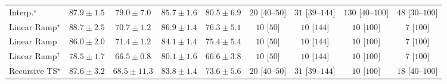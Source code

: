 \begin{tabular}{l|cccc|cccc|}
Interp.$^\star$ & {\cellcolor[HTML]{832D05}} \color[HTML]{F1F1F1} $87.9\pm 1.5$ & {\cellcolor[HTML]{C84A02}} \color[HTML]{F1F1F1} $79.0\pm 7.0$ & {\cellcolor[HTML]{933204}} \color[HTML]{F1F1F1} $85.7\pm 1.6$ & {\cellcolor[HTML]{BC4503}} \color[HTML]{F1F1F1} $80.5\pm 6.9$ & {\cellcolor[HTML]{FFF4F0}} \color[HTML]{000000} $20$ [$40$--$50$] & {\cellcolor[HTML]{FFF2EE}} \color[HTML]{000000} $31$ [$39$--$144$] & {\cellcolor[HTML]{FDDBD7}} \color[HTML]{000000} $130$ [$40$--$100$] & {\cellcolor[HTML]{FEEEEB}} \color[HTML]{000000} $48$ [$30$--$100$] \\
Linear Ramp$^\star$ & {\cellcolor[HTML]{7C2C05}} \color[HTML]{F1F1F1} $88.7\pm 2.5$ & {\cellcolor[HTML]{EF7718}} \color[HTML]{F1F1F1} $70.7\pm 1.2$ & {\cellcolor[HTML]{892F05}} \color[HTML]{F1F1F1} $86.9\pm 1.4$ & {\cellcolor[HTML]{D65808}} \color[HTML]{F1F1F1} $76.3\pm 5.1$ & {\cellcolor[HTML]{FFF7F3}} \color[HTML]{000000} $10$ [$50$] & {\cellcolor[HTML]{FFF7F3}} \color[HTML]{000000} $10$ [$144$] & {\cellcolor[HTML]{FFF7F3}} \color[HTML]{000000} $10$ [$100$] & {\cellcolor[HTML]{FFF7F3}} \color[HTML]{000000} $7$ [$100$] \\
Linear Ramp & {\cellcolor[HTML]{913204}} \color[HTML]{F1F1F1} $86.0\pm 2.0$ & {\cellcolor[HTML]{ED7316}} \color[HTML]{F1F1F1} $71.4\pm 1.2$ & {\cellcolor[HTML]{A03704}} \color[HTML]{F1F1F1} $84.1\pm 1.4$ & {\cellcolor[HTML]{DA5C0A}} \color[HTML]{F1F1F1} $75.4\pm 5.4$ & {\cellcolor[HTML]{FFF7F3}} \color[HTML]{000000} $10$ [$50$] & {\cellcolor[HTML]{FFF7F3}} \color[HTML]{000000} $10$ [$144$] & {\cellcolor[HTML]{FFF7F3}} \color[HTML]{000000} $10$ [$100$] & {\cellcolor[HTML]{FFF7F3}} \color[HTML]{000000} $7$ [$100$] \\
Linear Ramp$^\dagger$ & {\cellcolor[HTML]{CB4B02}} \color[HTML]{F1F1F1} $78.5\pm 1.7$ & {\cellcolor[HTML]{FB9225}} \color[HTML]{000000} $66.5\pm 0.8$ & {\cellcolor[HTML]{BE4503}} \color[HTML]{F1F1F1} $80.1\pm 1.6$ & {\cellcolor[HTML]{FA9125}} \color[HTML]{F1F1F1} $66.6\pm 3.8$ & {\cellcolor[HTML]{FFF7F3}} \color[HTML]{000000} $10$ [$50$] & {\cellcolor[HTML]{FFF7F3}} \color[HTML]{000000} $10$ [$144$] & {\cellcolor[HTML]{FFF7F3}} \color[HTML]{000000} $10$ [$100$] & {\cellcolor[HTML]{FFF7F3}} \color[HTML]{000000} $7$ [$100$] \\
Recursive TS$^\star$ & {\cellcolor[HTML]{842E05}} \color[HTML]{F1F1F1} $87.6\pm 3.2$ & {\cellcolor[HTML]{F5851F}} \color[HTML]{F1F1F1} $68.5\pm 11.3$ & {\cellcolor[HTML]{A13804}} \color[HTML]{F1F1F1} $83.8\pm 1.4$ & {\cellcolor[HTML]{E3660F}} \color[HTML]{F1F1F1} $73.6\pm 5.6$ & {\cellcolor[HTML]{FFF4F0}} \color[HTML]{000000} $20$ [$40$--$50$] & {\cellcolor[HTML]{FFF2EE}} \color[HTML]{000000} $31$ [$39$--$144$] & {\cellcolor[HTML]{FFF7F3}} \color[HTML]{000000} $10$ [$100$] & {\cellcolor[HTML]{FFF5F1}} \color[HTML]{000000} $18$ [$40$--$100$] \\

\end{tabular}
